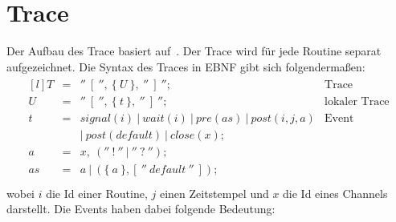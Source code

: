 \section{Trace}
Der Aufbau des Trace basiert auf~\cite{PPDP18}. Der Trace wird für jede Routine
separat aufgezeichnet. Die Syntax des Traces in EBNF gibt sich 
folgendermaßen:
\begin{align*}
  \begin{matrix*}[l]
    T & = & ''\ [\ '',\ \{\ U\ \},\ ''\ ]\ ''; & \text{Trace}\\
    U & = & ''\ [\ '',\ \{\ t\ \},\ ''\ ]\ ''; & \text{lokaler Trace} \\
    t & = & signal(i)\ |\ wait(i)\ |\ pre(as)\ |\ post(i, j, a) & \text{Event}\\
      &   & |\ post(default)\ |\ close(x); & \\
    a & = & x,\ (''\ !\ ''\ |\ ''\ ?\ ''); & \\
    as & = & a\ |\ (\{\ a\ \}, [\ ''\ default\ ''\ ]); & \\
  \end{matrix*}
\end{align*}
wobei $i$ die Id einer Routine, $j$ einen Zeitstempel und $x$ die Id eines 
Channels darstellt. Die Events haben dabei folgende Bedeutung:
